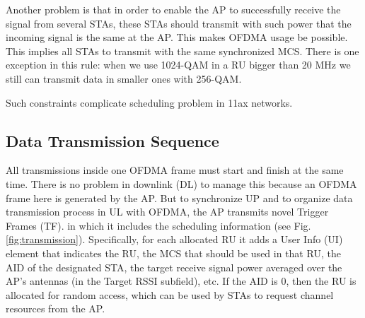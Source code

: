 Another problem is that in order to enable the AP to successfully receive the signal from several STAs, these STAs should transmit with such power that the incoming signal is the same at the AP.
This makes OFDMA usage be possible. 
This implies all STAs to transmit with the same synchronized MCS. 
There is one exception in this rule: when we use 1024-QAM in a RU bigger than 20 MHz we still can transmit data in smaller ones with 256-QAM. 

Such constraints complicate scheduling problem in 11ax networks.

\subsection{Data Transmission Sequence}

All transmissions inside one OFDMA frame must start and finish at the same time. 
There is no problem in downlink (DL) to manage this because an OFDMA frame here is generated by the AP. 
But to synchronize UP and to organize data transmission process in UL with OFDMA, the AP transmits novel Trigger Frames (TF). in which it includes the scheduling information (see Fig. \ref{fig:transmission}).
Specifically, for each allocated RU it adds a User Info (UI) element that indicates the RU, the MCS that should be used in that RU, the AID of the designated STA, the target receive signal power averaged over the AP's antennas (in the Target RSSI subfield), etc.
If the AID is $0$, then the RU is allocated for random access, which can be used by STAs to request channel resources from the AP.

